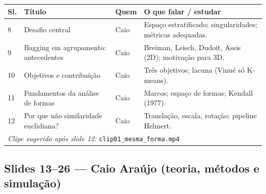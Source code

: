 \documentclass[12pt,a4paper]{article}
\begin{document}
\begin{longtable}{@{}p{1.1cm}p{5.2cm}p{2cm}p{5.9cm}@{}}
\toprule
\textbf{Sl.} & \textbf{Título} & \textbf{Quem} & \textbf{O que falar / estudar} \\
\midrule
\endhead
8 & Desafio central & Caio & Espaço estratificado; singularidades; métricas adequadas. \\
9 & Bagging em agrupamento: antecedentes & Caio & Breiman, Leisch, Dudoit, Assis (2D); motivação para 3D. \\
10 & Objetivos e contribuição & Caio & Três objetivos; lacuna (Vinué só K-means). \\
11 & Fundamentos da análise de formas & Caio & Marcos; espaço de formas; Kendall (1977). \\
12 & Por que não similaridade euclidiana? & Caio & Translação, escala, rotação; pipeline Helmert. \\
\midrule
\multicolumn{4}{l}{\textit{Clipe sugerido após slide 12:} \texttt{clip01\_mesma\_forma.mp4}} \\
\bottomrule
\end{longtable}

\subsection{Slides 13--26 --- Caio Araújo (teoria, métodos e simulação)}
\end{document}
